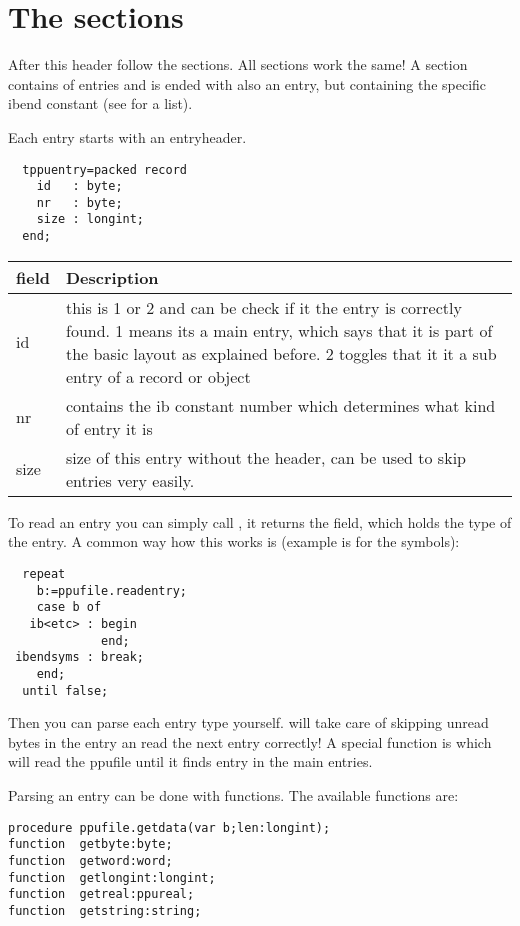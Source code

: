 \documentclass{report}
\begin{document}
\section{The sections}

After this header follow the sections. All sections work the same!
A section contains of entries and is ended with also an entry, but
containing the specific ibend constant (see  for a list).

Each entry starts with an entryheader.
\begin{verbatim}
  tppuentry=packed record
    id   : byte;
    nr   : byte;
    size : longint;
  end;
\end{verbatim}

\begin{tabular}{lp{10cm}}
field & Description \\ \hline
id & this is 1 or 2 and can be check if it the entry is correctly
found. 1 means its a main entry, which says that it is part of the
basic layout as explained before. 2 toggles that it it a sub entry
of a record or object \\
nr & contains the ib constant number which determines what kind of
entry it is \\
size & size of this entry without the header, can be used to skip entries
very easily. \\ \hline
\end{tabular}

To read an entry you can simply call ,
it returns the
 field, which holds the type of the entry.
A common way how this works is (example is for the symbols):

\begin{verbatim}
  repeat
    b:=ppufile.readentry;
    case b of
   ib<etc> : begin
             end;
 ibendsyms : break;
    end;
  until false;
\end{verbatim}

Then you can parse each entry type yourself.  will take
care of skipping unread bytes in the entry an read the next entry
correctly! A special function is 
which will read the ppufile until it finds entry  in the main
entries.

Parsing an entry can be done with  functions. The
available functions are:
\begin{verbatim}
procedure ppufile.getdata(var b;len:longint);
function  getbyte:byte;
function  getword:word;
function  getlongint:longint;
function  getreal:ppureal;
function  getstring:string;
\end{verbatim}
\end{document}
